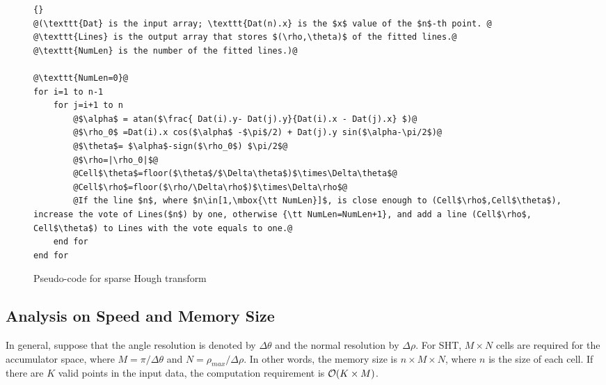 \documentclass[]{spie}
\begin{document}
 \begin{figure}[!htb]
\centering
    \begin{minipage}{130mm}
    \begin{lstlisting}{}
@(\texttt{Dat} is the input array; \texttt{Dat(n).x} is the $x$ value of the $n$-th point. @
@\texttt{Lines} is the output array that stores $(\rho,\theta)$ of the fitted lines.@
@\texttt{NumLen} is the number of the fitted lines.)@

@\texttt{NumLen=0}@
for i=1 to n-1
    for j=i+1 to n
        @$\alpha$ = atan($\frac{ Dat(i).y- Dat(j).y}{Dat(i).x - Dat(j).x} $)@
        @$\rho_0$ =Dat(i).x cos($\alpha$ -$\pi$/2) + Dat(j).y sin($\alpha-\pi/2$)@
        @$\theta$= $\alpha$-sign($\rho_0$) $\pi/2$@
        @$\rho=|\rho_0|$@
        @Cell$\theta$=floor($\theta$/$\Delta\theta$)$\times\Delta\theta$@
        @Cell$\rho$=floor($\rho/\Delta\rho$)$\times\Delta\rho$@
        @If the line $n$, where $n\in[1,\mbox{\tt NumLen}]$, is close enough to (Cell$\rho$,Cell$\theta$), increase the vote of Lines($n$) by one, otherwise {\tt NumLen=NumLen+1}, and add a line (Cell$\rho$, Cell$\theta$) to Lines with the vote equals to one.@
    end for
end for
    \end{lstlisting}
    \caption{Pseudo-code for sparse Hough transform}\label{fig:spcode}
    \end{minipage}
\end{figure}
    


\subsection{Analysis on Speed and Memory Size}
    In general, suppose that the angle resolution is denoted by $\Delta\theta$ and the normal resolution by  $\Delta\rho$. For SHT, $M\times N$ cells are required for the accumulator space, where $ M = \pi/\Delta\theta $ and  $N=\rho_{max}/\Delta\rho.$ In other words, the   memory size is $n\times M\times N$, where $n$ is the size of each cell. If there are $K$ valid points in the input data, the computation requirement is ${\cal O}(K\times M)$.
\end{document}
